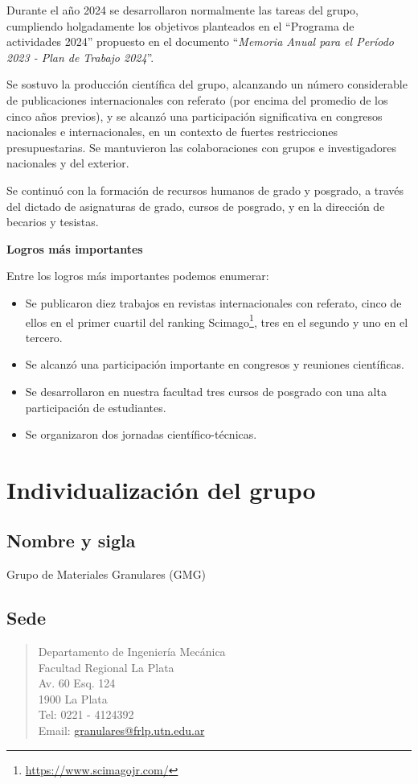 \documentclass[a4paper,11pt,twoside,final,titlepage,onecolumn,openright]{report}
\begin{document}
Durante el año 2024 se desarrollaron normalmente las tareas del grupo, cumpliendo holgadamente los objetivos planteados en el ``Programa de actividades 2024'' propuesto en el documento ``\textit{Memoria Anual para el Período 2023 - Plan de Trabajo 2024}''. 

Se sostuvo la producción científica del grupo, alcanzando un número considerable de publicaciones internacionales con referato (por encima del promedio de los cinco años previos), y se alcanzó una participación significativa en congresos nacionales e internacionales, en un contexto de fuertes restricciones presupuestarias. Se mantuvieron las colaboraciones con grupos e investigadores nacionales y del exterior.

Se continuó con la formación de recursos humanos de grado y posgrado, a través del dictado de asignaturas de grado, cursos de posgrado, y en la dirección de becarios y tesistas.

\vspace{0.5cm}

{\bf Logros más importantes}

Entre los logros más importantes podemos enumerar:

\begin{itemize}
\item Se publicaron diez trabajos en revistas internacionales con referato, cinco de ellos en el primer cuartil del ranking Scimago\footnote{\url{https://www.scimagojr.com/}}, tres en el segundo y uno en el tercero.
\item Se alcanzó una participación importante en congresos y reuniones científicas.
\item Se desarrollaron en nuestra facultad tres cursos de posgrado con una alta participación de estudiantes.
\item Se organizaron dos jornadas científico-técnicas.
\end{itemize}


\section{Individualización del grupo}

\subsection{Nombre y sigla}
 Grupo de Materiales Granulares (GMG)

 \subsection{Sede}
\begin{quote}
Departamento de Ingeniería Mecánica \\
Facultad Regional La Plata\\
Av. 60 Esq. 124\\
1900 La Plata \\
Tel: 0221 - 4124392\\
Email: \href{mailto://granulares@frlp.utn.edu.ar}{granulares@frlp.utn.edu.ar}
\end{quote}
\end{document}
